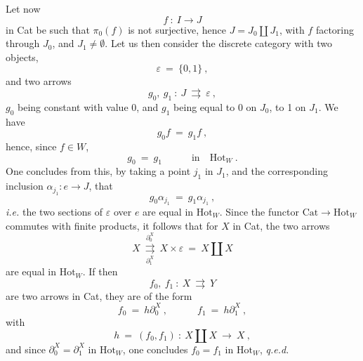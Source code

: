 \documentclass[11pt]{article}
\newcommand{\msp}[1]{\marginpar{\footnotesize [#1]}}
\newcommand{\Hot}{\mathrm{Hot}}
\newcommand{\Cat}{\mathrm{Cat}}
\begin{document}
Let now
\[
f\ :\ I\longrightarrow J
\]
in Cat be such that $\pi_0(f)$ is not surjective, hence $J=J_0\amalg J_1$, with $f$ factoring through $J_0$, and $J_1\neq\emptyset$. Let us then consider the discrete category with two objects,
\[
\varepsilon\ =\ \{0,1\}\ ,
\]
and two arrows
\[
g_0,\ g_1\ :\ J\ \rightrightarrows\ \varepsilon\ ,
\]
$g_0$ being constant with value 0, and $g_1$ being equal to 0 on $J_0$, to 1 on $J_1$. We have
\[
g_0f\ =\ g_1f\ ,
\]
hence, since $f\in W$,
\[
g_0\ =\ g_1\qquad\quad\text{in}\quad\Hot_W\ .
\]
One concludes from this, by taking a point $j_1$ in $J_1$, and the corresponding inclusion $\alpha_{j_1}:e\longrightarrow J$, that
\msp{page 133 quinquies}
\[
g_0\alpha_{j_1}\ =\ g_1\alpha_{j_1}\ ,
\]
\textit{i.e.} the two sections of $\varepsilon$ over $e$ are equal in $\Hot_W$. Since the functor $\Cat\longrightarrow\Hot_W$ commutes with finite products, it follows that for $X$ in Cat, the two arrows
\[
X\ \underset{\partial_1^X}{\overset{\partial_0^X}{\rightrightarrows}}\ X\times\varepsilon\ =\ X\amalg X
\]
are equal in $\Hot_W$. If then
\[
f_0,\ f_1\ :\ X\ \rightrightarrows\ Y
\]
are two arrows in Cat, they are of the form
\[
f_0\ =\ h\partial_0^X\ ,\qquad\quad f_1\ =\ h\partial_1^X\ ,
\]
with
\[
h\ =\ (f_0,f_1)\ :\ X\amalg X\ \longrightarrow\ X\ , %
\]
and since $\partial_0^X=\partial_1^X$ in $\Hot_W$, one concludes $f_0=f_1$ in $\Hot_W$, \quad \textit{q.e.d.}
\end{document}
